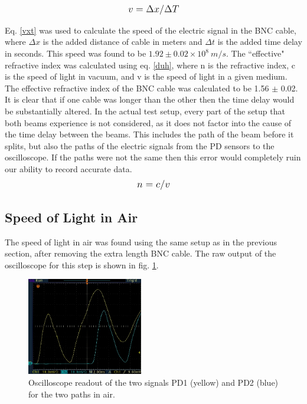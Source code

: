 \documentclass[aps,prl,reprint]{revtex4-2}
\begin{document}
\begin{equation}
	\mathlarger{v = \Delta x/\Delta T}
	\label{vxt}
\end{equation}

Eq. \ref{vxt} was used to calculate the speed of the electric signal in the BNC cable, where
$\Delta x$ is the added distance of cable in meters and $\Delta t$ is the added time delay
in seconds. This speed was found to be $1.92\pm0.02 \times 10^8\ m/s$. The ``effective" 
refractive index was calculated using eq. \ref{duh}, where n is the refractive index, c is
the speed of light in vacuum, and v is the speed of light in a given medium. The effective
refractive index of the BNC cable was calculated to be 1.56 $\pm$ 0.02. \\

It is clear that if one cable was longer than the other then the time delay would be 
substantially altered. In the actual test setup, every part of the setup that both
beams experience is not considered, as it does not factor into the cause of the time
delay between the beams. This includes the path of the beam before it splits, but
also the paths of the electric signals from the PD sensors to the oscilloscope. If
the paths were not the same then this error would completely ruin our ability to
record accurate data. \\

\begin{equation}
	\mathlarger{n=c/v}
	\label{duh}
\end{equation}

\subsection{Speed of Light in Air}

The speed of light in air was found using the same setup as in the previous section, after 
removing the extra length BNC cable. The raw output of the oscilloscope for this step is
shown in fig. \ref{air_osc}. \\

\begin{figure}[h]
\includegraphics[width=0.45\textwidth]{./BMPs/l4_D_1_a.jpg}
\caption{\label{air_osc} Oscilloscope readout of the two signals PD1 (yellow) and PD2
	(blue) for the two paths in air. }
\end{figure}
\end{document}
